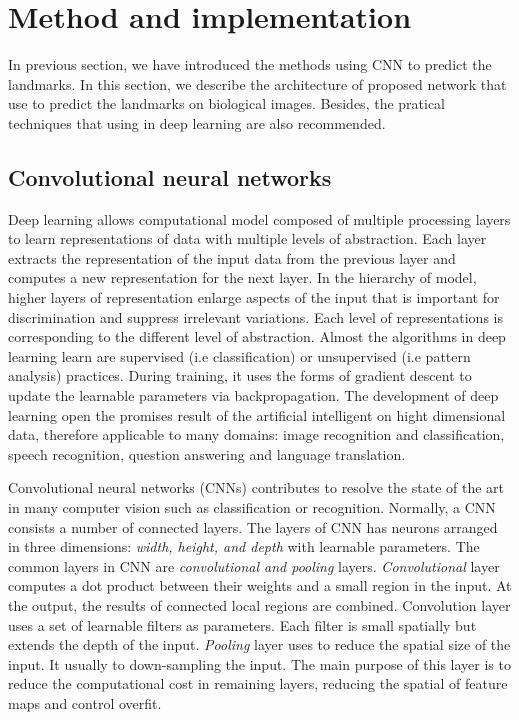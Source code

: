\documentclass[conference]{IEEEtran}
\begin{document}
\section{Method and implementation}
\label{sec3}
In previous section, we have introduced the methods using CNN to predict the landmarks. In this section, we describe the architecture of proposed network that use to predict the landmarks on biological images. Besides, the pratical techniques that using in deep learning are also recommended.
\subsection{Convolutional neural networks}
Deep learning allows computational model composed of multiple processing layers to learn representations of data with multiple levels of abstraction\cite{lecun2015deep}. Each layer extracts the representation of the input data from the previous layer and computes a new representation for the next layer. In the hierarchy of model, higher layers of representation enlarge aspects of the input that is important for discrimination and suppress irrelevant variations. Each level of representations is corresponding to the different level of abstraction. Almost the algorithms in deep learning learn are supervised (i.e classification) or unsupervised (i.e pattern analysis) practices. During training, it uses the forms of gradient descent to update the learnable parameters via backpropagation. The development of deep learning open the promises result of the artificial intelligent on hight dimensional data, therefore applicable to many domains: image recognition and classification\cite{krizhevsky2012imagenet,ciregan2012multi,szegedy2015going}, speech recognition\cite{mikolov2011strategies,hinton2012deep,sainath2013deep}, question answering\cite{bordes2014question} and language translation\cite{sutskever2014sequence}\cite{jean2014using}.

Convolutional neural networks (CNNs) contributes to resolve the state of the art in many computer vision such as classification\cite{krizhevsky2012imagenet}\cite{ciregan2012multi} or recognition\cite{li2015convolutional}\cite{tompson2014joint}. Normally, a CNN consists a number of connected layers. The layers of CNN has neurons arranged in three dimensions: \textit{width, height, and depth} with learnable parameters. The common layers in CNN are \textit{convolutional and pooling} layers. \textit{Convolutional} layer computes a dot product between their weights and a small region in the input. At the output, the results of connected local regions are combined. Convolution layer uses a set of learnable filters as parameters. Each filter is small spatially but extends the depth of the input. \textit{Pooling} layer uses to reduce the spatial size of the input. It usually to down-sampling the input. The main purpose of this layer is to reduce the computational cost in remaining layers, reducing the spatial of feature maps and control overfit.
\end{document}
